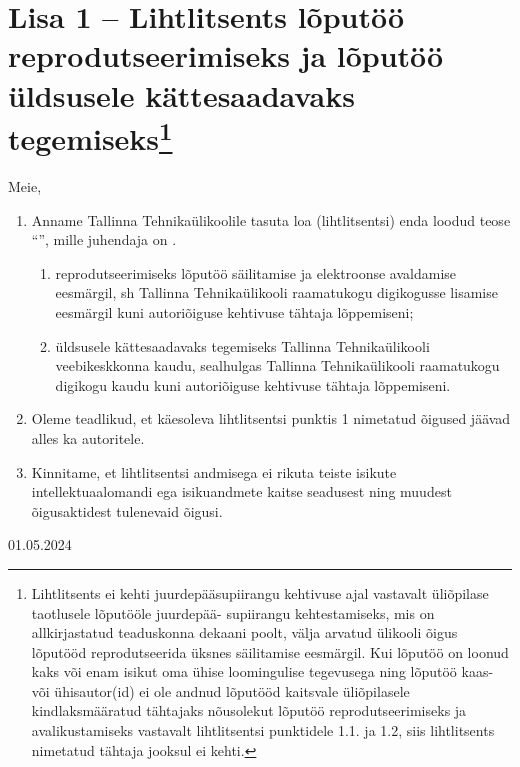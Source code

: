 \newcommand{\licenseFootnote}{Lihtlitsents ei kehti juurdepääsupiirangu kehtivuse ajal vastavalt üliõpilase taotlusele lõputööle juurdepää- supiirangu kehtestamiseks, mis on allkirjastatud teaduskonna dekaani poolt, välja arvatud ülikooli õigus lõputööd reprodutseerida üksnes säilitamise eesmärgil. Kui lõputöö on loonud kaks või enam isikut oma ühise loomingulise tegevusega ning lõputöö kaas- või ühisautor(id) ei ole andnud lõputööd kaitsvale üliõpilasele kindlaksmääratud tähtajaks nõusolekut lõputöö reprodutseerimiseks ja avalikustamiseks vastavalt lihtlitsentsi punktidele 1.1. ja 1.2, siis lihtlitsents nimetatud tähtaja jooksul ei kehti.}

\label{chapter:license}
{\let\clearpage\relax\chapter*{Lisa 1 – Lihtlitsents lõputöö reprodutseerimiseks ja lõputöö üldsusele kättesaadavaks tegemiseks\footnote{\licenseFootnote}}}

Meie, \authorNames{}

\begin{enumerate}[label*=\arabic*.]
    \item Anname Tallinna Tehnikaülikoolile tasuta loa (lihtlitsentsi) enda loodud teose “\thesisTitle{}”, mille juhendaja on \supervisorName{}.
    \begin{enumerate}[label*=\arabic*.]
        \item reprodutseerimiseks lõputöö säilitamise ja elektroonse avaldamise eesmärgil, sh Tallinna Tehnikaülikooli raamatukogu digikogusse lisamise eesmärgil kuni autoriõiguse kehtivuse tähtaja lõppemiseni;
        \item üldsusele kättesaadavaks tegemiseks Tallinna Tehnikaülikooli veebikeskkonna kaudu, sealhulgas Tallinna Tehnikaülikooli raamatukogu digikogu kaudu kuni autoriõiguse kehtivuse tähtaja lõppemiseni.
    \end{enumerate}
    \item Oleme teadlikud, et käesoleva lihtlitsentsi punktis 1 nimetatud õigused jäävad alles ka autoritele.
    \item Kinnitame, et lihtlitsentsi andmisega ei rikuta teiste isikute intellektuaalomandi ega isikuandmete kaitse seadusest ning muudest õigusaktidest tulenevaid õigusi.
\end{enumerate}

01.05.2024

